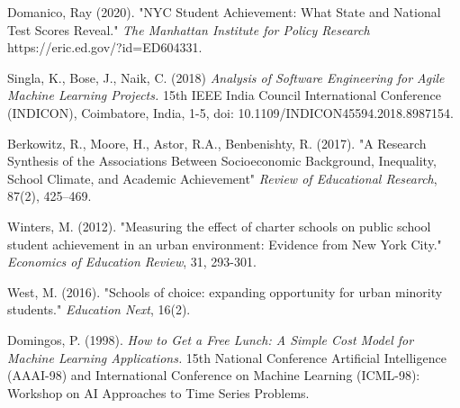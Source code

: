 \documentclass[sigconf,nonacm,11pt]{acmart}
\begin{document}
\begin{thebibliography}{9}
Domanico, Ray (2020). "NYC Student Achievement: What State and National Test Scores Reveal."  \textit{The Manhattan Institute for Policy Research} https://eric.ed.gov/?id=ED604331. 

Singla, K., Bose, J., Naik, C. (2018) \textit{Analysis of Software Engineering for Agile Machine Learning Projects.} 15th IEEE India Council International Conference (INDICON), Coimbatore, India, 1-5, doi: 10.1109/INDICON45594.2018.8987154.

Berkowitz, R., Moore, H., Astor, R.A., Benbenishty, R. (2017). "A Research Synthesis of the Associations Between Socioeconomic Background, Inequality, School Climate, and Academic Achievement" \textit{Review of Educational Research}, 87(2), 425–469.

Winters, M. (2012). "Measuring the effect of charter schools on public school student achievement in an urban environment: Evidence from New York City." \textit{Economics of Education Review}, 31, 293-301.

West, M. (2016). "Schools of choice: expanding opportunity for urban minority students." \textit{Education Next}, 16(2).

Domingos, P. (1998). \textit{How to Get a Free Lunch: A Simple Cost Model for Machine Learning Applications.} 15th National Conference Artificial Intelligence (AAAI-98) and International Conference on Machine Learning (ICML-98): Workshop on AI Approaches to Time Series Problems.

\end{thebibliography}




\appendix
\end{document}
